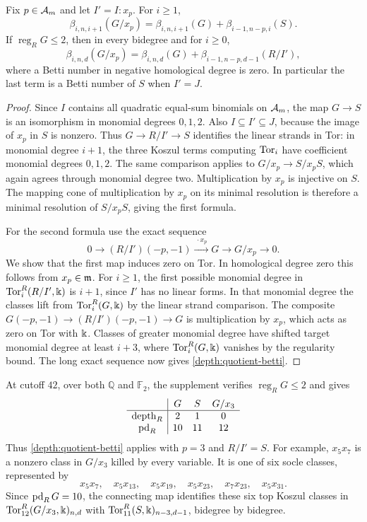 \begin{proposition}
\label{depth:variable-betti}
Fix $p\in\mathcal A_m$ and let $I'=I:x_p$. For $i\ge1$,
\[
 \beta_{i,n,i+1}(G/x_p)
 =\beta_{i,n,i+1}(G)+\beta_{i-1,n-p,i}(S).
\]
If $\operatorname{reg}_R G\le2$, then in every bidegree and for $i\ge0$,
\begin{equation}\label{depth:quotient-betti}
 \beta_{i,n,d}(G/x_p)
 =\beta_{i,n,d}(G)+\beta_{i-1,n-p,d-1}(R/I'),
\end{equation}
where a Betti number in negative homological degree is zero.
In particular the last term is a Betti number of $S$ when $I'=J$.
\end{proposition}
\begin{proof}
Since $I$ contains all quadratic equal-sum binomials on $\mathcal A_m$,
the map $G\to S$ is an isomorphism in monomial degrees $0,1,2$.
Also $I\subseteq I'\subseteq J$, because the image of $x_p$ in $S$ is
nonzero. Thus $G\to R/I'\to S$ identifies the linear strands in Tor:
in monomial degree $i+1$, the three Koszul terms computing $\operatorname{Tor}_i$ have
coefficient monomial degrees $0,1,2$. The same comparison applies to
$G/x_p\to S/x_pS$, which again agrees through monomial degree two.
Multiplication by $x_p$ is injective on $S$. The mapping cone of
multiplication by $x_p$ on its minimal resolution is therefore a
minimal resolution of $S/x_pS$, giving the first formula.

For the second formula use the exact sequence
\[
 0\longrightarrow (R/I')(-p,-1)
 \xrightarrow{\ \cdot x_p\ } G\longrightarrow G/x_p\longrightarrow0.
\]
We show that the first map induces zero on Tor. In homological degree
zero this follows from $x_p\in\mathfrak m$. For $i\ge1$, the first possible
monomial degree in $\operatorname{Tor}_i^R(R/I',\Bbbk)$ is $i+1$, since $I'$ has no linear forms.
In that monomial degree the classes lift from $\operatorname{Tor}_i^R(G,\Bbbk)$ by the linear
strand comparison. The composite $G(-p,-1)\to(R/I')(-p,-1)\to G$
is multiplication by $x_p$, which acts as zero on Tor with $\Bbbk$.
Classes of greater monomial degree have shifted target monomial degree at least $i+3$,
where $\operatorname{Tor}_i^R(G,\Bbbk)$ vanishes by the regularity bound.
The long exact sequence now gives \eqref{depth:quotient-betti}.
\end{proof}

At cutoff $42$, over both $\mathbb Q$ and $\mathbb F_2$, the supplement
verifies $\operatorname{reg}_R G\le2$ and gives
\[
\begin{array}{c|ccc}
 &G&S&G/x_3\\ \hline
 \operatorname{depth}_R &2&1&0\\
 \operatorname{pd}_R &10&11&12
\end{array}
\]
Thus \eqref{depth:quotient-betti} applies with $p=3$ and $R/I'=S$. For
example, $x_5x_7$ is a nonzero class in $G/x_3$ killed by every
variable. It is one of six socle classes, represented by
\[
 x_5x_7,\quad x_5x_{13},\quad x_5x_{19},\quad
 x_5x_{23},\quad x_7x_{23},\quad x_5x_{31}.
\]
Since $\operatorname{pd}_R G=10$, the connecting map identifies these six top
Koszul classes in $\operatorname{Tor}_{12}^R(G/x_3,\Bbbk)_{n,d}$ with
$\operatorname{Tor}_{11}^R(S,\Bbbk)_{n-3,d-1}$, bidegree by bidegree.

